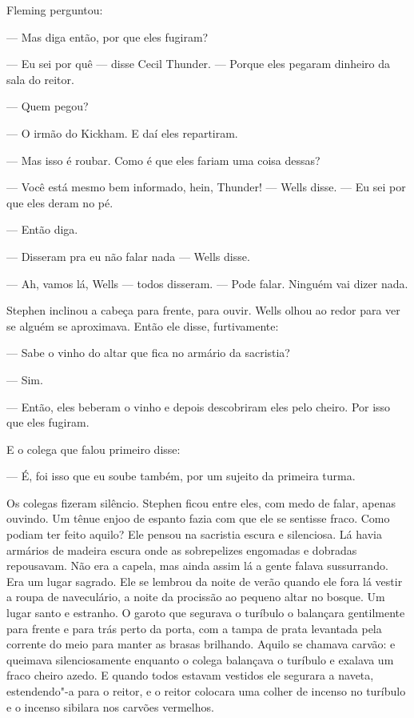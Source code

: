 Fleming perguntou:

 --- Mas diga então, por que eles fugiram?

 --- Eu sei por quê --- disse Cecil Thunder. --- Porque eles pegaram dinheiro da sala do reitor.

 --- Quem pegou?

 --- O irmão do Kickham. E daí eles repartiram.

 --- Mas isso é roubar. Como é que eles fariam uma coisa dessas?

 --- Você está mesmo bem informado, hein, Thunder! --- Wells disse. --- Eu sei por que eles deram no pé.

 --- Então diga.

 --- Disseram pra eu não falar nada --- Wells disse.

 --- Ah, vamos lá, Wells --- todos disseram. --- Pode falar. Ninguém vai dizer nada.

Stephen inclinou a cabeça para frente, para ouvir. Wells olhou ao redor
para ver se alguém se aproximava. Então ele disse, furtivamente:

 --- Sabe o vinho do altar que fica no armário da sacristia?

 --- Sim.

 --- Então, eles beberam o vinho e depois descobriram eles pelo cheiro. Por isso que eles fugiram.

E o colega que falou primeiro disse:

 --- É, foi isso que eu soube também, por um sujeito da primeira turma.

Os colegas fizeram silêncio. Stephen ficou entre eles, com medo de
falar, apenas ouvindo. Um tênue enjoo de espanto fazia com que ele se
sentisse fraco. Como podiam ter feito aquilo? Ele pensou na sacristia
escura e silenciosa. Lá havia armários de madeira escura onde as
sobrepelizes engomadas e dobradas repousavam. Não era a capela, mas
ainda assim lá a gente falava sussurrando. Era um lugar sagrado. Ele se
lembrou da noite de verão quando ele fora lá vestir a roupa de
naveculário, a noite da procissão ao pequeno altar no bosque. Um lugar
santo e estranho. O garoto que segurava o turíbulo o balançara
gentilmente para frente e para trás perto da porta, com a tampa de
prata levantada pela corrente do meio para manter as brasas brilhando.
Aquilo se chamava carvão: e queimava silenciosamente enquanto o colega
balançava o turíbulo e exalava um fraco cheiro azedo. E quando todos
estavam vestidos ele segurara a naveta, estendendo"-a para o reitor, e o
reitor colocara uma colher de incenso no turíbulo e o incenso sibilara
nos carvões vermelhos.

